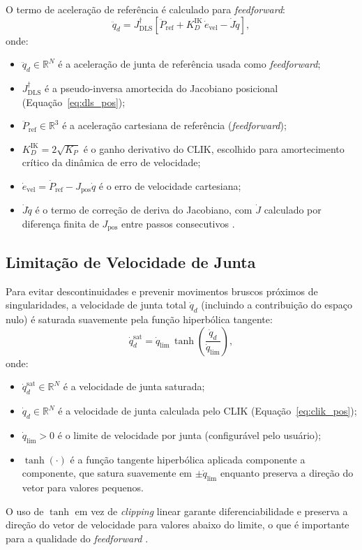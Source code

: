 O termo de aceleração de referência é calculado para \textit{feedforward}:
\begin{equation}
    \ddot{q}_d = J_{\text{DLS}}^{\dagger} \left[\ddot{P}_{\text{ref}} + K_D^{\text{IK}}\,\dot{e}_{\text{vel}} - \dot{J}\dot{q}\right],
    \label{eq:clik_ddq}
\end{equation}
onde:
\begin{itemize}
    \item $\ddot{q}_d \in \mathbb{R}^N$ é a aceleração de junta de referência usada como \textit{feedforward};
    \item $J_{\text{DLS}}^{\dagger}$ é a pseudo-inversa amortecida do Jacobiano posicional (Equação~\eqref{eq:dls_pos});
    \item $\ddot{P}_{\text{ref}} \in \mathbb{R}^3$ é a aceleração cartesiana de referência (\textit{feedforward});
    \item $K_D^{\text{IK}} = 2\sqrt{K_P}$ é o ganho derivativo do CLIK, escolhido para amortecimento crítico da dinâmica de erro de velocidade;
    \item $\dot{e}_{\text{vel}} = \dot{P}_{\text{ref}} - J_{\text{pos}}\dot{q}$ é o erro de velocidade cartesiana;
    \item $\dot{J}\dot{q}$ é o termo de correção de deriva do Jacobiano, com $\dot{J}$ calculado por diferença finita de $J_{\text{pos}}$ entre passos consecutivos \cite{siciliano2009robotics}.
\end{itemize}

\subsection{Limitação de Velocidade de Junta}

Para evitar descontinuidades e prevenir movimentos bruscos próximos de singularidades, a velocidade de junta total $\dot{q}_d$ (incluindo a contribuição do espaço nulo) é saturada suavemente pela função hiperbólica tangente:
\begin{equation}
    \dot{q}_d^{\text{sat}} = \dot{q}_{\text{lim}}\,\tanh\!\left(\frac{\dot{q}_d}{\dot{q}_{\text{lim}}}\right),
    \label{eq:dq_saturation}
\end{equation}
onde:
\begin{itemize}
    \item $\dot{q}_d^{\text{sat}} \in \mathbb{R}^N$ é a velocidade de junta saturada;
    \item $\dot{q}_d \in \mathbb{R}^N$ é a velocidade de junta calculada pelo CLIK (Equação~\eqref{eq:clik_pos});
    \item $\dot{q}_{\text{lim}} > 0$ é o limite de velocidade por junta (configurável pelo usuário);
    \item $\tanh(\cdot)$ é a função tangente hiperbólica aplicada componente a componente, que satura suavemente em $\pm \dot{q}_{\text{lim}}$ enquanto preserva a direção do vetor para valores pequenos.
\end{itemize}
O uso de $\tanh$ em vez de \textit{clipping} linear garante diferenciabilidade e preserva a direção do vetor de velocidade para valores abaixo do limite, o que é importante para a qualidade do \textit{feedforward} \cite{siciliano2009robotics}.

